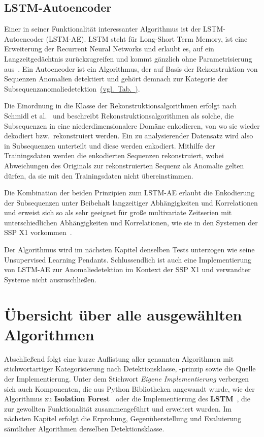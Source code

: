 \subsection{LSTM-Autoencoder}
Einer in seiner Funktionalität interessanter Algorithmus ist der LSTM-Autoencoder (LSTM-AE). LSTM steht für Long-Short Term Memory, ist eine Erweiterung der
Recurrent Neural Networks und erlaubt es, auf ein Langzeitgedächtnis zurückzugreifen und kommt gänzlich ohne Parametrisierung aus~\cite{Hochreiter1997}.
Ein Autoencoder ist ein Algorithmus, der auf Basis der Rekonstruktion von Sequenzen Anomalien detektiert und gehört demnach zur Kategorie der
Subsequenzanomaliedetektion~\hyperref[tab:algorithmen]{(vgl.~Tab.~)}.

Die Einordnung in die Klasse der Rekonstruktionsalgorithmen erfolgt nach Schmidl et al.~\cite{Schmidl2022} und beschreibt Rekonstruktionsalgorithmen
als solche, die Subsequenzen in eine niederdimensionalere Do\-mäne enkodieren, von wo sie wieder dekodiert bzw.~rekonstruiert werden. Ein zu analysierender
Datensatz wird also in Subsequenzen unterteilt und diese werden enkodiert. Mithilfe der Trainingsdaten werden die enkodierten Sequenzen rekonstruiert,
wobei Abweichungen des Originals zur rekonstruierten Sequenz als Anomalie gelten dürfen, da sie mit den Trainingsdaten nicht übereinstimmen.

Die Kombination der beiden Prinzipien zum LSTM-AE erlaubt die Enkodierung der Subsequenzen unter Beibehalt langzeitiger Abhängigkeiten und Korrelationen
und erweist sich so als sehr geeignet für große multivariate Zeitserien mit unterschiedlichen Abhängigkeiten und Korrelationen, wie sie in den Systemen
der SSP X1 vorkommen~\cite{Wei2022}.

Der Algorithmus wird im nächsten Kapitel denselben Tests unterzogen wie seine Unsupervised Learning Pendants. Schlussendlich ist auch eine
Implementierung von LSTM-AE zur Anomaliedetektion im Kontext der SSP X1 und verwandter Systeme nicht auszuschließen.

\section{Übersicht über alle ausgewählten Algorithmen}

Abschließend folgt eine kurze Auflistung aller genannten Algorithmen mit stichwortartiger Kategorisierung nach Detektionsklasse, -prinzip sowie die Quelle der
Implementierung. Unter dem Stichwort \textit{Eigene Implementierung} verbergen sich auch Komponenten, die aus Python Bibliotheken angewandt wurde, wie der
Algorithmus zu \textbf{Isolation Forest}~\cite{scikit-learn} oder die Implementierung des \textbf{LSTM}~\cite{pytorch}, die zur gewollten Funktionalität
zusammengeführt und erweitert wurden. Im nächsten Kapitel erfolgt die Erprobung, Gegenüberstellung und Evaluierung sämtlicher Algorithmen derselben
Detektionsklasse.


